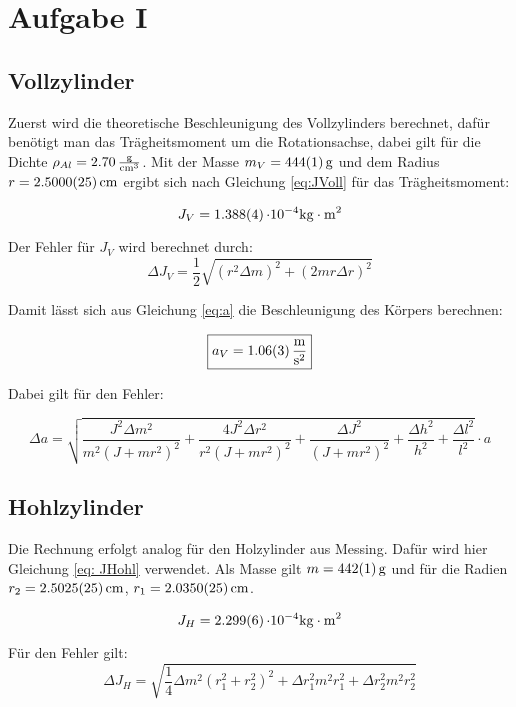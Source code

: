 \section{Aufgabe I}
\subsection{Vollzylinder}

Zuerst wird die theoretische Beschleunigung des Vollzylinders berechnet, dafür benötigt man das Trägheitsmoment
um die Rotationsachse, dabei gilt für die Dichte $\rho_{Al} = \SI{2,70}{\frac{\gram}{\cm^3}}$.
Mit der Masse $m_V = \SI{444 \pm 1}{\gram}$ und dem Radius $r = \SI{2,5000\pm 0,0025}{\cm}$ ergibt sich nach Gleichung \ref{eq:JVoll} für das Trägheitsmoment:

\[ J_V = \SI{1,388 \pm 0,004}{\cdot 10^{-4} \kilogram \cdot \meter^2} \]

Der Fehler für $J_V$ wird berechnet durch:
\begin{equation}
    \Delta J_V = \frac{1}{2}\sqrt{(r^2 \Delta m)^2 + (2mr\Delta r)^2}
\end{equation}

Damit lässt sich aus Gleichung \ref{eq:a} die Beschleunigung des Körpers berechnen:

\[\boxed{a_V = \SI{1,06 \pm 0,03}{\frac{\meter}{\second^2}}}\]

Dabei gilt für den Fehler:

\begin{equation}
    \Delta a=\sqrt{\frac{J^{2} \Delta m^{2}}{m^{2} \left(J + m r^{2}\right)^{2}} + \frac{4 J^{2} \Delta r^{2}}{r^{2} \left(J + m r^{2}\right)^{2}} + \frac{\Delta J^{2}}{\left(J + m r^{2}\right)^{2}} + \frac{\Delta h^{2}}{h^{2}} + \frac{\Delta l^{2}}{l^{2}}}\cdot a
\end{equation}

\subsection{Hohlzylinder}

Die Rechnung erfolgt analog für den Holzylinder aus Messing. Dafür wird hier Gleichung \ref{eq: JHohl} verwendet.
Als Masse gilt $m=\SI{442 \pm 1}{\gram}$ und für die Radien $r_2 = \SI{2,5025 \pm 0,0025}{\cm}$, $r_1 = \SI{2,0350\pm 0,0025}{\cm}$.

\[ J_H = \SI{2,299 \pm 0,006}{\cdot 10^{-4} \kilogram \cdot \meter^2}\]

Für den Fehler gilt:
\begin{equation}
    \Delta J_H=\sqrt{\frac{1}{4} \Delta m^{2} \left(r_{1}^{2} + r_{2}^{2}\right)^{2} + \Delta r_{1}^{2} m^{2} r_{1}^{2} + \Delta r_{2}^{2} m^{2} r_{2}^{2}}
\end{equation}


